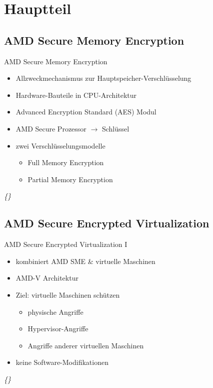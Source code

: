 \documentclass{sdqbeamer}
\begin{document}
\section{Hauptteil}

\subsection{AMD Secure Memory Encryption}
\begin{frame}{AMD Secure Memory Encryption}
	\begin{itemize}
		\item Allzweckmechanismus zur Hauptspeicher-Verschlüsselung
		\item Hardware-Bauteile in CPU-Architektur
		\item Advanced Encryption Standard (AES) Modul
		\item AMD Secure Prozessor \(\rightarrow\) Schlüssel
		\item zwei Verschlüsselungsmodelle
		\begin{itemize}
			\item Full Memory Encryption
			\item Partial Memory Encryption
		\end{itemize}
	\end{itemize}
	\vfill
	\textit{\{\cite{kaplan}\}}
\end{frame}

\subsection{AMD Secure Encrypted Virtualization}
\begin{frame}{AMD Secure Encrypted Virtualization I}
	\begin{itemize}
		\item kombiniert AMD SME \& virtuelle Maschinen
		\item AMD-V Architektur
		\item Ziel: virtuelle Maschinen schützen
		\begin{itemize}
			\item physische Angriffe
			\item Hypervisor-Angriffe
			\item Angriffe anderer virtuellen Maschinen
		\end{itemize}
		\item keine Software-Modifikationen
	\end{itemize}
	\vfill
	\textit{\{\cite{kaplan, buhren}\}}
\end{frame}
\end{document}
